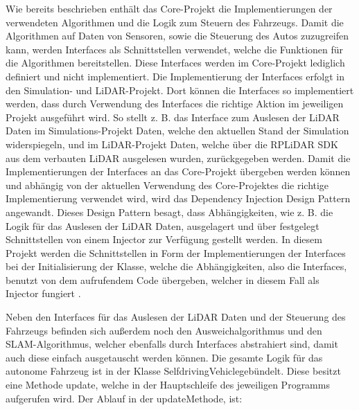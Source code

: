 Wie bereits beschrieben enthält das Core-Projekt die Implementierungen der verwendeten Algorithmen und die Logik zum Steuern des Fahrzeugs. Damit die Algorithmen auf Daten von Sensoren, sowie die Steuerung des Autos zuzugreifen kann, werden Interfaces als Schnittstellen verwendet, welche die Funktionen für die Algorithmen bereitstellen. Diese Interfaces werden im Core-Projekt lediglich definiert und nicht implementiert. Die Implementierung der Interfaces erfolgt in den Simulation- und LiDAR-Projekt. Dort können die Interfaces so implementiert werden, dass durch Verwendung des Interfaces die richtige Aktion im jeweiligen Projekt ausgeführt wird. So stellt z. B. das Interface zum Auslesen der LiDAR Daten im Simulations-Projekt Daten, welche den aktuellen Stand der Simulation widerspiegeln, und im LiDAR-Projekt Daten, welche über die RPLiDAR SDK aus dem verbauten LiDAR ausgelesen wurden, zurückgegeben werden. Damit die Implementierungen der Interfaces an das Core-Projekt übergeben werden können und abhängig von der aktuellen Verwendung des Core-Projektes die richtige Implementierung verwendet wird, wird das Dependency Injection Design Pattern angewandt. Dieses Design Pattern besagt, dass Abhängigkeiten, wie z. B. die Logik für das Auslesen der LiDAR Daten, ausgelagert und über festgelegt Schnittstellen von einem Injector zur Verfügung gestellt werden. In diesem Projekt werden die Schnittstellen in Form der Implementierungen der Interfaces bei der Initialisierung der Klasse, welche die Abhängigkeiten, also die Interfaces, benutzt von dem aufrufendem Code übergeben, welcher in diesem Fall als Injector fungiert \cite{dependencyInjection}. 

Neben den Interfaces für das Auslesen der LiDAR Daten und der Steuerung des Fahrzeugs befinden sich außerdem noch den Ausweichalgorithmus und den SLAM-Algorithmus, welcher ebenfalls durch Interfaces abstrahiert sind, damit auch diese einfach ausgetauscht werden können. Die gesamte Logik für das autonome Fahrzeug ist in der Klasse \dq SelfdrivingVehicle\dq\space gebündelt. Diese besitzt eine Methode \dq update\dq, welche in der Hauptschleife des jeweiligen Programms aufgerufen wird. Der Ablauf in der \dq update\dq\space Methode, ist:

